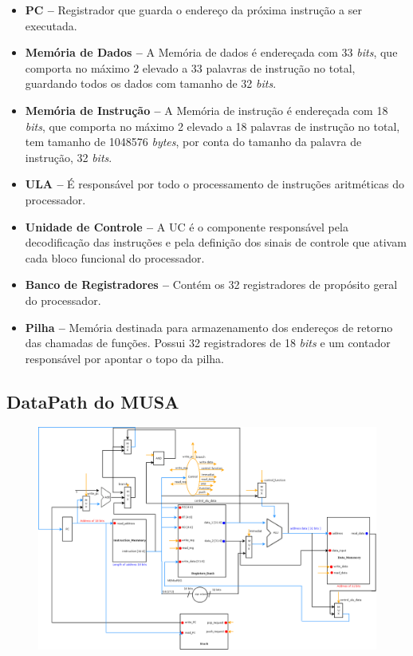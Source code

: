 \documentclass{report}
\begin{document}
  \begin{itemize}
    \item \textbf{PC --} Registrador que guarda o endereço da próxima instrução a ser executada.

    \item \textbf{Memória de Dados --} A Memória de dados é endereçada com 33 \textit{bits}, que comporta no máximo 2 elevado a 33 palavras de instrução no total, guardando todos os dados com tamanho de 32 \textit{bits}.
   
    \item \textbf{Memória de Instrução --} A Memória de instrução é endereçada com 18 \textit{bits}, que comporta no máximo 2 elevado a 18 palavras de instrução no total, tem tamanho de 1048576 \textit{bytes}, por conta do tamanho da palavra de instrução, 32 \textit{bits}.
    
    \item \textbf{ULA --} É responsável por todo o processamento de instruções aritméticas do processador.
    
    \item \textbf{Unidade de Controle --} A UC é o componente responsável pela decodificação das instruções e pela definição dos sinais de controle que ativam cada bloco funcional do processador.
    
    \item \textbf{Banco de Registradores --} Contém os 32 registradores de propósito geral do processador.
    
    \item \textbf{Pilha --} Memória destinada para armazenamento dos endereços de retorno das chamadas de funções. Possui 32 registradores de 18 \textit{bits} e um contador responsável por apontar o topo da pilha.
  \end{itemize}
  \newpage
  
  \begin{landscape}
  	\section{DataPath do MUSA}
  	\begin{figure}[H]
  		\centering
  		\includegraphics[width=610px]{./pictures/datapath/DataPath.png}
  	\end{figure}
  \end{landscape}
  
\end{document}
